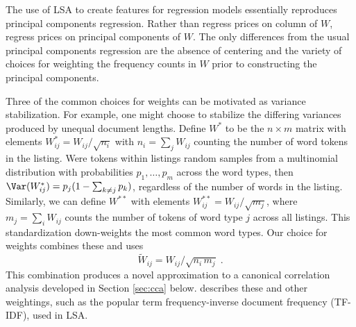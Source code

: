\documentclass[12pt]{article}
\begin{document}
 The use of LSA to create features for regression models essentially reproduces
 principal components regression.  Rather than regress prices on column of $W$,
 regress prices on principal components of $W$.  The only differences from the 
 usual principal components regression are the absence of centering and the 
 variety of choices for weighting the frequency counts in $W$ prior
 to constructing the principal components.
 

 Three of the common choices for weights can be motivated as variance stabilization. 
 For example, one might choose to stabilize the differing variances produced by 
 unequal document lengths.  Define
 ${W}^{*}$ to be the $n \times m$ matrix with elements ${W}^{*}_{ij} =
 W_{ij}/\sqrt{n_i}$ with $n_i = \sum_j W_{ij}$ counting the number of word
 tokens in the \ith listing.  Were tokens within listings random samples from a
 multinomial distribution with probabilities $p_{1}, \ldots, p_{m}$ across the word types,
 then $\Var({W}^{*}_{ij}) = p_j(1-\sum_{k\ne j} p_k)$, regardless of the
 number of words in the listing.  Similarly, we can define $W^{**}$ with elements
 $W^{**}_{ij} = W_{ij}/\sqrt{m_j}$, where $m_j = \sum_i W_{ij}$ counts the
 number of tokens of word type $j$ across all listings. This standardization
 down-weights the most common word types.  Our choice for weights combines these and uses
  \begin{equation}
   \widetilde{W}_{ij} = W_{ij}/\sqrt{n_i\,m_j} \;.
  \label{eq:Wtij}
  \end{equation}
  This combination produces a novel approximation to a canonical correlation analysis developed in Section \ref{sec:cca} below. \citet{turney10} describes these and other weightings, such as the popular term frequency-inverse document
 frequency (TF-IDF),  used in LSA. 
  
  
 
\end{document}
